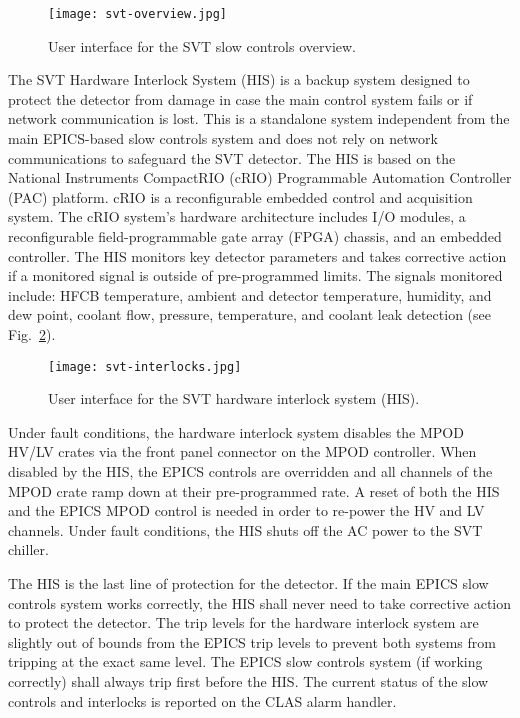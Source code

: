 \begin{figure}[hbt] 
\centering 
\texttt{[image: svt-overview.jpg]}
\caption{User interface for the SVT slow controls overview.}
\label{fig:svt-overview}
\end{figure}

The SVT Hardware Interlock System (HIS) is a backup system designed to protect the detector from damage in case the main control system fails or if network communication is lost. This is a standalone system independent from the main EPICS-based slow controls system and does not rely on network communications to safeguard the SVT detector. The HIS is based on the National Instruments CompactRIO (cRIO) Programmable Automation Controller (PAC) platform. cRIO is a reconfigurable embedded control and acquisition system. The cRIO system's hardware architecture includes I/O modules, a reconfigurable field-programmable gate array (FPGA) chassis, and an embedded controller. The HIS monitors key detector parameters and takes corrective action if a monitored signal is outside of pre-programmed limits. The signals monitored include: HFCB temperature, ambient and detector temperature, humidity, and dew point, coolant flow, pressure, temperature, and coolant leak detection (see Fig.~\ref{fig:svt-interlocks}). 

\begin{figure}[hbt] 
\centering 
\texttt{[image: svt-interlocks.jpg]}
\caption{User interface for the SVT hardware interlock system (HIS).}
\label{fig:svt-interlocks}
\end{figure}

Under fault conditions, the hardware interlock system disables the MPOD HV/LV crates via the front panel connector on the MPOD controller. When disabled by the HIS, the EPICS controls are overridden and all channels of the MPOD crate ramp down at their pre-programmed rate. A reset of both the HIS and the EPICS MPOD control is needed in order to re-power the HV and LV channels. Under fault conditions, the HIS shuts off the AC power to the SVT chiller. 


The HIS is the last line of protection for the detector. If the main EPICS slow controls system works correctly, the HIS shall never need to take corrective action to protect the detector. The trip levels for the hardware interlock system are slightly out of bounds from the EPICS trip levels to prevent both systems from tripping at the exact same level. The EPICS slow controls system (if working correctly) shall always trip first before the HIS. The current status of the slow controls and interlocks is reported on the CLAS alarm handler. %

